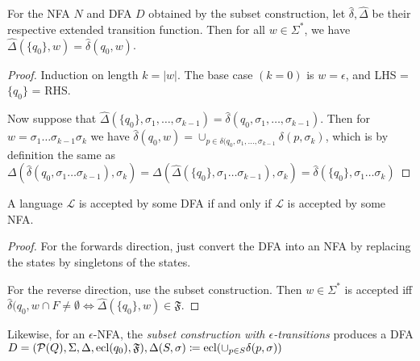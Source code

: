 \documentclass[10pt,a4paper]{article}
\begin{document}
\begin{theorem}
For the NFA $N$ and DFA $D$ obtained by the subset construction, let $\hat{\delta}, \hat{\Delta}$ be their respective extended transition function. Then for all $w \in \Sigma^{\ast}$, we have $\hat{\Delta}(\{q_0\}, w) = \hat{\delta}(q_0, w)$.
\end{theorem}
\begin{proof}
Induction on length $k = |w|$. The base case $(k=0)$ is $w = \epsilon$, and LHS = $\{q_0\}$ = RHS.

Now suppose that $\hat{\Delta}(\{q_0\}, \sigma_1, \ldots, \sigma_{k-1}) = \hat{\delta}(q_0, \sigma_1, \ldots, \sigma_{k-1})$. Then for $w = \sigma_1\ldots \sigma_{k-1}\sigma_k$ we have $\hat{\delta}(q_0,w) = \cup_{p\in \delta(q_0, \sigma_1, \ldots, \sigma_{k-1}} \delta(p,\sigma_k)$, which is by definition the same as $\Delta(\hat{\delta}(q_0, \sigma_1\ldots\sigma_{k-1}),\sigma_k) = \Delta(\hat{\Delta}(\{q_0\},\sigma_1\ldots\sigma_{k-1}),\sigma_k) = \hat{\delta}(\{q_0\}, \sigma_1\ldots\sigma_k)$
\end{proof}

\begin{corollary}
A language $\mathcal{L}$ is accepted by some DFA if and only if $\mathcal{L}$ is accepted by some NFA.
\end{corollary}
\begin{proof}
For the forwards direction, just convert the DFA into an NFA by replacing the states by singletons of the states.

For the reverse direction, use the subset construction. Then $w \in \Sigma^{\ast}$ is accepted iff $\hat{\delta}(q_0, w \cap F \neq \emptyset \iff \hat{\Delta}(\{q_0\},w) \in \mathfrak{F}$.
\end{proof}

Likewise, for an $\epsilon$-NFA, the \emph{subset construction with $\epsilon$-transitions} produces a DFA $D = (\mathcal{P}(Q), \Sigma, \Delta, \operatorname{ecl}(q_0), \mathfrak{F}), \Delta(S, \sigma) \coloneqq \operatorname{ecl}(\cup_{p\in S} \delta(p, \sigma))$
\end{document}
